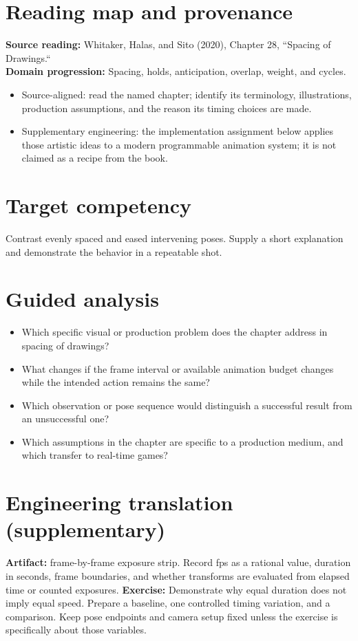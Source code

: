 \documentclass[10pt,letterpaper]{article}
\begin{document}
\makedoctitle
\makedocsummary

\section{Reading map and provenance}
\textbf{Source reading:} Whitaker, Halas, and Sito (2020), Chapter 28, ``Spacing of Drawings.``\\
\textbf{Domain progression:} Spacing, holds, anticipation, overlap, weight, and cycles.
\begin{itemize}
\item Source-aligned: read the named chapter; identify its terminology, illustrations, production assumptions, and the reason its timing choices are made.
\item Supplementary engineering: the implementation assignment below applies those artistic ideas to a modern programmable animation system; it is not claimed as a recipe from the book.
\end{itemize}
\section{Target competency}
Contrast evenly spaced and eased intervening poses. Supply a short explanation and demonstrate the behavior in a repeatable shot.
\section{Guided analysis}
\begin{itemize}
\item Which specific visual or production problem does the chapter address in spacing of drawings?
\item What changes if the frame interval or available animation budget changes while the intended action remains the same?
\item Which observation or pose sequence would distinguish a successful result from an unsuccessful one?
\item Which assumptions in the chapter are specific to a production medium, and which transfer to real-time games?
\end{itemize}
\section{Engineering translation (supplementary)}
\textbf{Artifact:} frame-by-frame exposure strip. Record fps as a rational value, duration in seconds, frame boundaries, and whether transforms are evaluated from elapsed time or counted exposures.
\textbf{Exercise:} Demonstrate why equal duration does not imply equal speed. Prepare a baseline, one controlled timing variation, and a comparison. Keep pose endpoints and camera setup fixed unless the exercise is specifically about those variables.
\end{document}

